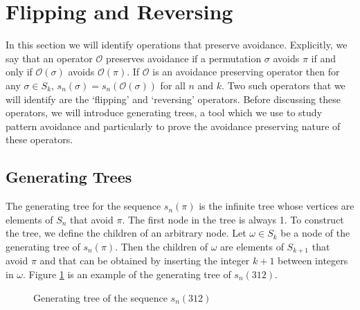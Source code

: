 \documentclass[11pt,letterpaper,twoside,english]{article}
\theoremstyle{theorem}
\theoremstyle{remark}
\begin{document}
\section{Flipping and Reversing}

In this section we will identify operations that preserve avoidance. Explicitly, we say that an operator $\mathcal{O}$ preserves avoidance if a permutation $\sigma$ avoids $\pi$ if and only if $\mathcal{O}(\sigma)$ avoids $\mathcal{O}(\pi)$. If $\mathcal{O}$ is an avoidance preserving operator then for any $\sigma\in S_k$, $s_n(\sigma)=s_n(\mathcal{O}(\sigma))$ for all $n$ and $k$. Two such operators that we will identify are the `flipping' and `reversing' operators.  Before discussing these operators, we will introduce generating trees, a tool which we use to study pattern avoidance and particularly to prove the avoidance preserving nature of these operators. 

\subsection{Generating Trees}

The generating tree for the sequence $s_n(\pi)$ is the infinite tree whose vertices are elements of $S_n$ that avoid $\pi$. The first node in the tree is always 1. To construct the tree, we define the children of an arbitrary node. Let $\omega\in S_k$ be a node of the generating tree of $s_n(\pi)$. Then the children of $\omega$ are elements of $S_{k+1}$ that avoid $\pi$ and that can be obtained by inserting the integer $k+1$ between integers in $\omega$. Figure \ref{fig:M1} is an example of the generating tree of $s_n(312)$. 

\begin{figure}[h!]
\caption{Generating tree of the sequence $s_n(312)$} \label{fig:M1}
\end{figure}
\end{document}

